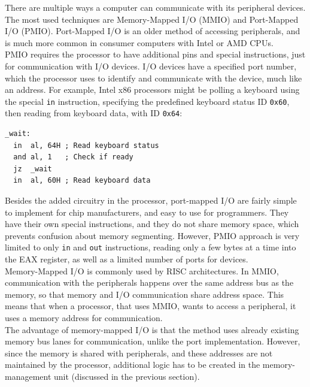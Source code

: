 \label{sec:io}
There are multiple ways a computer can communicate with its peripheral devices.
The most used techniques are Memory-Mapped I/O (MMIO) and Port-Mapped I/O
(PMIO). Port-Mapped I/O is an older method of accessing peripherals, and is much
more common in consumer computers with Intel or AMD CPUs\cite{intelmanual}.\\
PMIO requires the processor to have additional pins and special instructions,
just for communication with I/O devices. I/O devices have a specified port
number, which the processor uses to identify and communicate with the device,
much like an address.
For example, Intel x86 processors might be polling
a keyboard using the special \texttt{in} instruction, specifying the predefined
keyboard status ID \texttt{0x60}, then reading from keyboard data, with ID
\texttt{0x64}\cite{intel:pch}\cite{osdev:io_ports}:
\begin{lstlisting}[language={[x86masm]Assembler}]
_wait:
  in  al, 64H ; Read keyboard status
  and al, 1   ; Check if ready
  jz  _wait
  in  al, 60H ; Read keyboard data
\end{lstlisting}
Besides the added circuitry in the processor, port-mapped I/O are fairly
simple to implement for chip manufacturers, and easy to use for programmers.
They have their own special instructions,
and they do not share memory space, which prevents confusion about
memory segmenting.
However, PMIO approach is very limited to only \texttt{in} and \texttt{out}
instructions, reading only a few bytes at a time into the EAX register, as well
as a limited number of ports for devices.\cite{intelmanual}\\

Memory-Mapped I/O is commonly used by RISC architectures. In MMIO,
communication with the peripherals happens over the same address bus as the
memory, so that memory and I/O communication share address space. This means
that when a processor, that uses MMIO, wants to access a peripheral, it uses a
memory address for communication.\\
The advantage of memory-mapped I/O is that the method uses already existing
memory bus lanes for communication, unlike the port implementation. However,
since the memory is shared with peripherals, and these addresses are not
maintained by the processor, additional logic has to be created in the
memory-management unit (discussed in the previous section).


